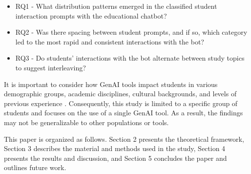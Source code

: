 \documentclass[a4paper,twoside]{article}
\begin{document}
\begin{itemize}
  \item RQ1 - What distribution patterns emerged in the classified student
  interaction prompts with the educational chatbot?
  \item RQ2 - Was there spacing between student prompts, and if so, which
  category led to the most rapid and consistent interactions with the bot?
  \item RQ3 - Do students' interactions with the bot alternate between study
  topics to suggest interleaving?
\end{itemize}


It is important to consider how GenAI tools impact students in
various demographic groups, academic disciplines, cultural backgrounds, and
levels of previous experience \citep{catalan21} \citep{neo22}. Consequently,
this study is limited to a specific group of students and focuses on the use of
a single GenAI tool. As a result, the findings may not be generalizable to other
populations or tools.

This paper is organized as follows. Section 2 presents the theoretical
framework, Section 3 describes the material and methods used in the study,
Section 4 presents the results and discussion, and Section 5 concludes the
paper and outlines future work.



\end{document}
